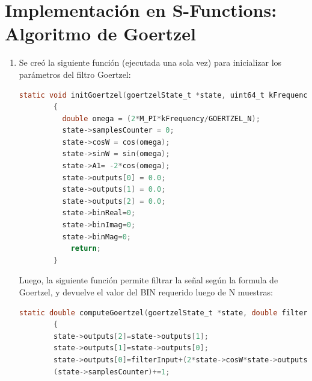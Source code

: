 \documentclass[letterpaper,onecolumn,10pt,journal,final]{IEEEtran}
\begin{document}
\section{Implementación en S-Functions: Algoritmo de Goertzel}
\begin{enumerate}[1)]
    \item %
    Se creó la siguiente función (ejecutada una sola vez) para inicializar los parámetros del filtro Goertzel:
    \begin{lstlisting}[language=C]
        static void initGoertzel(goertzelState_t *state, uint64_t kFrequency)
        {
          double omega = (2*M_PI*kFrequency/GOERTZEL_N);
          state->samplesCounter = 0;
          state->cosW = cos(omega);
          state->sinW = sin(omega);
          state->A1= -2*cos(omega);
          state->outputs[0] = 0.0;
          state->outputs[1] = 0.0;
          state->outputs[2] = 0.0;
          state->binReal=0;
          state->binImag=0;
          state->binMag=0;
        	return;
        }
    \end{lstlisting}
    Luego, la siguiente función permite filtrar la señal según la formula de Goertzel, y devuelve el valor del BIN requerido luego de N muestras:
    \begin{lstlisting}[language=C]
        static double computeGoertzel(goertzelState_t *state, double filterInput)
        {
        state->outputs[2]=state->outputs[1];
        state->outputs[1]=state->outputs[0];
        state->outputs[0]=filterInput+(2*state->cosW*state->outputs[1])-(state->outputs[2]);
        (state->samplesCounter)+=1;
        

\end{lstlisting}
\end{enumerate}
\end{document}
